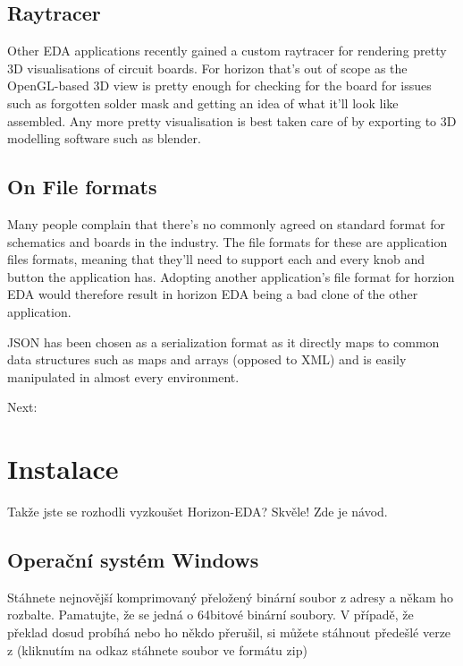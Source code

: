 \documentclass[letterpaper,10pt,czech]{sphinxmanual}
\begin{document}
\section{Raytracer}
\label{\detokenize{non-goals:raytracer}}
Other EDA applications recently gained a custom raytracer for rendering
pretty 3D visualisations of circuit boards. For horizon that’s out of
scope as the OpenGL-based 3D view is pretty enough for checking for the
board for issues such as forgotten solder mask and getting an idea of
what it’ll look like assembled. Any more pretty visualisation is best
taken care of by exporting to 3D modelling software such as blender.


\section{On File formats}
\label{\detokenize{non-goals:on-file-formats}}
Many people complain that there’s no commonly agreed on standard format
for schematics and boards in the industry. The file formats for these
are application files formats, meaning that they’ll need to support
each and every knob and button the application has. Adopting another
application’s file format for horzion EDA would therefore result in
horizon EDA being a bad clone of the other application.

JSON has been chosen as a serialization format as it directly maps to
common data structures such as maps and arrays (opposed to XML) and is
easily manipulated in almost every environment.

Next: {\hyperref[\detokenize{installation::doc}]{}}


\chapter{Instalace}
\label{\detokenize{installation:instalace}}\label{\detokenize{installation::doc}}
Takže jste se rozhodli vyzkoušet Horizon-EDA? Skvěle! Zde je návod.


\section{Operační systém Windows}
\label{\detokenize{installation:operacni-system-windows}}
Stáhnete nejnovější komprimovaný přeložený binární soubor z adresy 
a někam ho rozbalte. Pamatujte, že se jedná o 64bitové binární soubory. V případě, že překlad dosud probíhá  nebo ho někdo přerušil, si můžete stáhnout předešlé verze z
(kliknutím na odkaz stáhnete soubor ve formátu zip)
\end{document}
